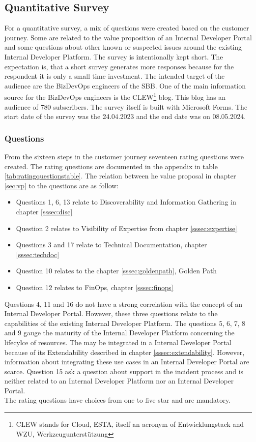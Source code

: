 \documentclass[a4paper,12pt]{article}
\begin{document}
    \subsection{Quantitative Survey}
    \label{subsec:quansur}
    For a quantitative survey, a mix of questions were created based on the customer journey.
    Some are related to the value proposition of an Internal Developer Portal and some questions about other known or
    suspected issues around the existing Internal Developer Platform.
    The survey is intentionally kept short.
    The expectation is, that a short survey generates more responses because for the respondent it is only a small time investment.
    The intended target of the audience are the BizDevOps engineers of the SBB.
    One of the main information source for the BizDevOps engineers is the CLEW\footnote{CLEW stands for Cloud, ESTA,
        itself an acronym of Entwicklungstack and WZU, Werkzeugunterstützung} blog.
    This blog has an audience of 780 subscribers.
    The survey itself is built with Microsoft Forms.
    The start date of the survey was the 24.04.2023 and the end date was on 08.05.2024.

    \subsubsection{Questions}
    From the sixteen steps in the customer journey seventeen rating questions were created.
    The rating questions are documented in the appendix in table \ref{tab:ratingquestionstable}.
    The relation between he value proposal in chapter \ref{sec:vp} to the questions are as follow:
    \begin{itemize}
        \item Questions 1, 6, 13 relate to Discoverability and Information Gathering in chapter \ref{sssec:disc}
        \item Question 2 relates to Visibility of Expertise from chapter \ref{sssec:expertise}
        \item Questions 3 and 17 relate to Technical Documentation, chapter \ref{sssec:techdoc}
        \item Question 10 relates to the chapter \ref{sssec:goldenpath}, Golden Path
        \item Question 12 relates to FinOps, chapter \ref{sssec:finops}
    \end{itemize}
    Questions 4, 11 and 16 do not have a strong correlation with the concept of an Internal Developer Portal.
    However, these three questions relate to the capabilities of the existing Internal Developer Platform.
    The questions 5, 6, 7, 8 and 9 gauge the maturity of the Internal Developer Platform concerning the lifecylce of resources.
    The may be integrated in a Internal Developer Portal because of its Extendability described in chapter \ref{sssec:extendability}.
    However, information about integrating these use cases in an Internal Developer Portal are scarce.
    Question 15 ask a question about support in the incident process and is neither related to an Internal Developer Platform
    nor an Internal Developer Portal. \\
    The rating questions have choices from one to five star and are mandatory.
\end{document}
